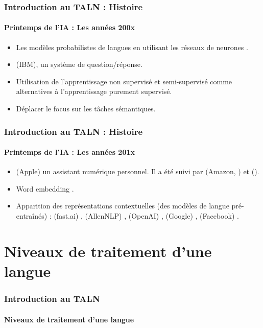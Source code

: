 \documentclass[xcolor=table]{beamer}
\begin{document}
\begin{frame}
\frametitle{Introduction au TALN : Histoire}
\framesubtitle{Printemps de l'IA : Les années 200x}

\begin{itemize}
	\item {} Les modèles probabilistes de langues en utilisant les réseaux de neurones \cite{2003-bengio-al}.
	\item {}  (IBM), un système de question/réponse.
	\item Utilisation de l'apprentissage non supervisé et semi-supervisé comme alternatives à l'apprentissage purement supervisé.
	\item Déplacer le focus sur les tâches sémantiques.
\end{itemize}

\end{frame}

\begin{frame}
\frametitle{Introduction au TALN : Histoire}
\framesubtitle{Printemps de l'IA : Les années 201x}

\begin{itemize}
	\item {}  (Apple)  un assistant numérique personnel. Il a été suivi par  (Amazon, ) et  ().
	\item {} Word embedding \cite{2014-lebret-collobert}.
	\item {} Apparition des représentations contextuelles (des modèles de langue pré-entraînés) :  (fast.ai) \cite{2018-howard-ruder},  (AllenNLP) \cite{2018-peters-al},  (OpenAI) \cite{2018-radford-al},  (Google) \cite{2018-devlin-al},  (Facebook) \cite{2019-lample-conneau}.
\end{itemize}

\end{frame}

\section{Niveaux de traitement d'une langue}

\begin{frame}
\frametitle{Introduction au TALN}
\framesubtitle{Niveaux de traitement d'une langue}


\end{frame}
\end{document}
